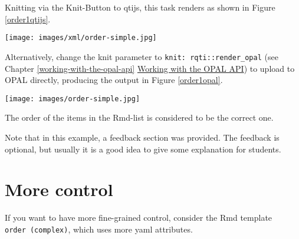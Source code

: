 \documentclass[twoside]{tufte-book}
\begin{document}
Knitting via the Knit-Button to qtijs, this task renders as shown in Figure \ref{order1qtijs}.

\begin{figure*}
\centering
\texttt{[image: images/xml/order-simple.jpg]}
\caption{\label{order1qtijs}Simple order task rendered in qtijs}
\end{figure*}

\noindent Alternatively, change the knit parameter to \texttt{knit:\ rqti::render\_opal} (see Chapter \ref{working-with-the-opal-api} \href{api_opal.html}{Working with the OPAL API}) to upload to OPAL directly, producing the output in Figure \ref{order1opal}.

\begin{figure*}
\centering
\texttt{[image: images/order-simple.jpg]}
\caption{\label{order1opal}Simple order task rendered in OPAL}
\end{figure*}

The order of the items in the Rmd-list is considered to be the correct one.

Note that in this example, a feedback section was provided. The feedback is
optional, but usually it is a good idea to give some explanation for students.

\section{More control}\label{more-control-5}

If you want to have more fine-grained control, consider the Rmd template \texttt{order\ (complex)}, which uses more yaml attributes.
\end{document}
